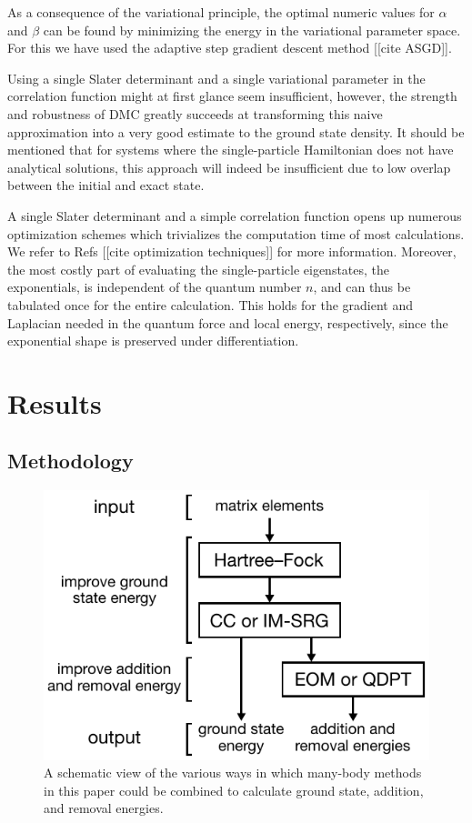 As a consequence of the variational principle, the optimal numeric values for $\alpha$ and $\beta$ can be found by minimizing the energy in the variational parameter space.  For this we have used the adaptive step gradient descent method [[cite ASGD]].

Using a single Slater determinant and a single variational parameter in the correlation function might at first glance seem insufficient,
however, the strength and robustness of DMC greatly succeeds at transforming this naive approximation into a very good estimate to the ground
state density. It should be mentioned that for systems where the single-particle Hamiltonian does not have analytical solutions, this approach
will indeed be insufficient due to low overlap between the initial and exact state.

A single Slater determinant and a simple correlation function opens up numerous optimization schemes which trivializes the computation time of most calculations.  We refer to Refs [[cite optimization techniques]] for more information.  Moreover, the most costly part of evaluating the single-particle eigenstates, the exponentials, is independent of the quantum number $n$, and can thus be tabulated once for the entire calculation. This holds for the gradient and Laplacian needed in the quantum force and local energy, respectively, since the exponential shape is preserved under differentiation.

\section{Results}
\label{sec:results}

\subsection{Methodology}

\begin{figure}
  \centering
  \includegraphics[width=0.8\linewidth]{figures/fig-methods}
  \caption{A schematic view of the various ways in which many-body methods in this paper could be combined to calculate ground state, addition, and removal energies.}
  \label{fig:methods}
\end{figure}

